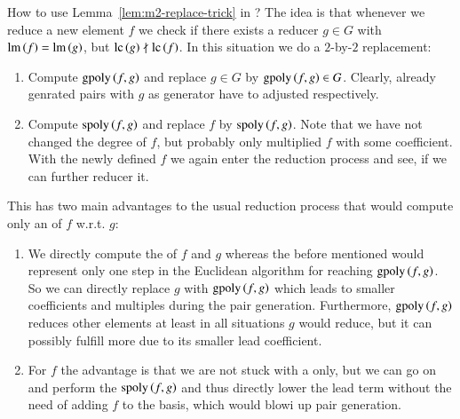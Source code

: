 How to use Lemma~\ref{lem:m2-replace-trick} in \bba ? The idea is that whenever
we reduce a new element $f$ we check if there exists a reducer $g\in G$ with
$\operatorname{lm}\left({f}\right) = \operatorname{lm}\left({g}\right)$, but $\mathrm{lc}\left({g}\right) \nmid \mathrm{lc}\left({f}\right)$. In this situation we do a $2$-by-$2$
replacement:
\begin{enumerate}
\item Compute $\mathrm{gpoly}\left({f},{g}\right)$ and replace $g\in G$ by $\mathrm{gpoly}\left({f},{g}\right) \in G$. Clearly,
already genrated pairs with $g$ as generator have to adjusted respectively.
\item Compute $\mathrm{spoly}\left({f},{g}\right)$ and replace $f$ by $\mathrm{spoly}\left({f},{g}\right)$. Note that we have not
changed the degree of $f$, but probably only multiplied $f$ with some
coefficient. With the newly defined $f$ we again enter the reduction process and
see, if we can further reducer it.
\end{enumerate}
This has two main advantages to the usual reduction process that would compute
only an \lcr of $f$ w.r.t. $g$:
\begin{enumerate}
\item We directly compute the \gpt of $f$ and $g$
whereas the before mentioned \lcr would represent only one step in the Euclidean
algorithm for reaching $\mathrm{gpoly}\left({f},{g}\right)$. So we can directly replace $g$ with
$\mathrm{gpoly}\left({f},{g}\right)$ which leads to smaller coefficients and multiples during the pair
generation. Furthermore, $\mathrm{gpoly}\left({f},{g}\right)$ reduces other elements at least in all
situations $g$ would reduce, but it can possibly fulfill more \ltrs due to its
smaller lead coefficient. 
\item For $f$ the advantage is that we are not stuck with a \lcr only, but we
can go on and perform the \ltr $\mathrm{spoly}\left({f},{g}\right)$ and thus directly lower the lead term
without the need of adding $f$ to the basis, which would blowi up pair
generation.
\end{enumerate}

